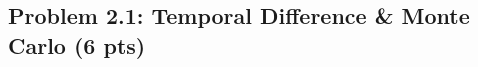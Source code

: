 \documentclass[12pt]{article}
\begin{document}

\subsection*{Problem 2.1: Temporal Difference \& Monte Carlo (6 pts)}
\end{document}
